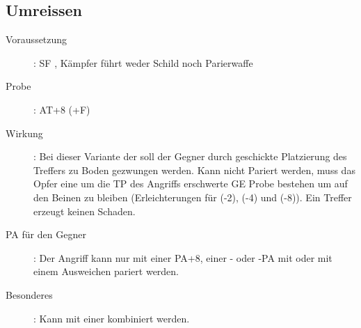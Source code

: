\subsection{Umreissen}
\label{aktion.umreissen}
\begin{description}
    \item[Voraussetzung]:
        SF , Kämpfer führt weder Schild noch Parierwaffe
    \item[Probe]:
        AT+8 (+F)
    \item[Wirkung]:
        Bei dieser Variante der  soll der Gegner durch geschickte Platzierung des Treffers zu Boden gezwungen werden.
        Kann nicht Pariert werden, muss das Opfer eine um die TP des Angriffs erschwerte GE Probe bestehen um auf den Beinen zu bleiben (Erleichterungen für  (-2),  (-4) und  (-8)).
        Ein Treffer erzeugt keinen Schaden.
    \item[PA für den Gegner]:
        Der Angriff kann nur mit einer PA+8, einer - oder -PA mit  oder mit einem Ausweichen pariert werden.
    \item[Besonderes]:
        Kann mit einer  kombiniert werden.
\end{description}
